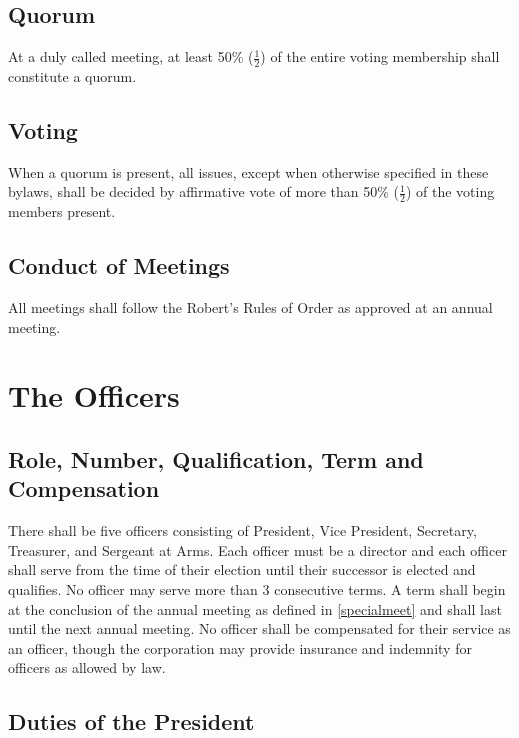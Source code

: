 \documentclass[10pt,letterpaper,titlepage]{article}
\begin{document}
\subsection{Quorum}
 
At a duly called meeting, at least 50\% ($\frac{1}{2}$) of the entire voting
membership shall constitute a quorum. 

\subsection{Voting}
 
When a quorum is present, all issues, except when otherwise specified in these
bylaws, shall be decided by affirmative vote of more than 50\% ($\frac{1}{2}$)
of the voting members present. 

\subsection{Conduct of Meetings}
\label{condofmeet}
 
All meetings shall follow the Robert's Rules of Order as approved at an annual
meeting.


\section{The Officers}
\label{officers}

\subsection{Role, Number, Qualification, Term and Compensation}
 
There shall be five officers consisting of President, Vice President,
Secretary, Treasurer, and Sergeant at Arms.
Each officer must be a director and each officer shall serve from the time of
their election until their successor is elected and qualifies.
No officer may serve more than 3 consecutive terms.
A term shall begin at the conclusion of the annual meeting as defined in
\ref{specialmeet} and shall last until the next annual meeting.
No officer shall be compensated for their service as an officer, though the
corporation may provide insurance and indemnity for officers as allowed by law.

\subsection{Duties of the President}
\end{document}
